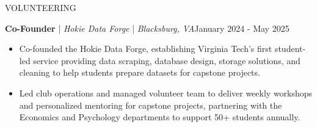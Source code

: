 \begin{rSection}{VOLUNTEERING}
    \renewcommand{\labelitemi}{\rule{0.8ex}{0.8ex}}

    \textbf{Co-Founder} | \textit{Hokie Data Forge} | \textit{Blacksburg, VA}\hfill January 2024 - May 2025\\
    \begin{itemize}[leftmargin=12pt]
        \itemsep -4pt {} \vspace{-1.75em}
        \item Co-founded the Hokie Data Forge, establishing Virginia Tech's first student-led service providing data scraping, database design, storage solutions, and cleaning to help students prepare datasets for capstone projects.
        \item Led club operations and managed volunteer team to deliver weekly workshops and personalized mentoring for capstone projects, partnering with the Economics and Psychology departments to support 50+ students annually.
    \end{itemize}

\end{rSection}
